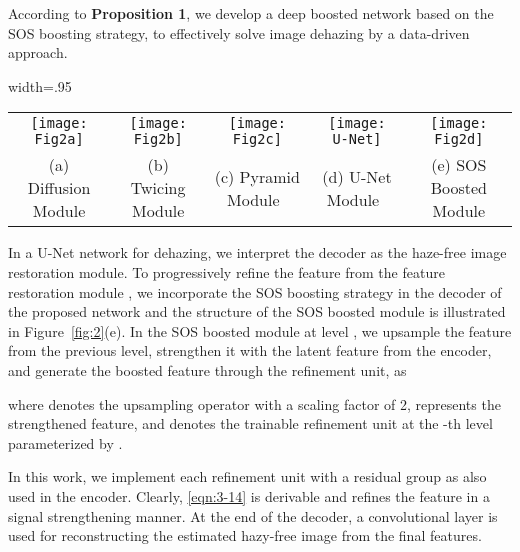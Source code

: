 \documentclass[10pt,twocolumn,letterpaper]{article}
\newcommand{\figref}[1]{Figure~\ref{fig:#1}}
\begin{document}
  According to {\bf Proposition 1}, we develop a deep boosted network based on the SOS boosting strategy, to effectively solve image dehazing by a data-driven approach.
  
\begin{figure*}[!htb]
    \centering
    \begin{adjustbox}{width=.95\linewidth}
    \begin{tabular}{ccccc}
      \texttt{[image: Fig2a]} & \hspace{3mm}
      \texttt{[image: Fig2b]} & \hspace{3mm}
      \texttt{[image: Fig2c]} & \hspace{5mm}
      \texttt{[image: U-Net]} & \hspace{5mm}
      \texttt{[image: Fig2d]} \\
      (a) Diffusion Module \cite{DiffusionBoosting} & (b) Twicing Module \cite{TwicingBoosting} & (c) Pyramid Module~\cite{FPN} & (d) U-Net Module~\cite{UNet} & (e) SOS Boosted Module
    \end{tabular}
  \end{adjustbox}
    \caption{
      \textbf{Architectures of different boosted modules.}
The green trapezoidal block denotes the deconvolutional layer with a stride of 2 in the decoder module.
    }
\label{fig:2}
    \vspace{-6mm}
    \end{figure*}


  In a U-Net network for dehazing, we interpret the decoder as the haze-free image restoration module.
To progressively refine the feature  from the feature restoration module ,
we incorporate the SOS boosting strategy in the decoder of the proposed network and the structure of the SOS boosted module is illustrated in \figref{2}(e).
In the SOS boosted module at level , we upsample the feature  from the previous level, strengthen it with the latent feature  from the encoder,
  and generate the boosted feature  through the refinement unit, as

where  denotes the upsampling operator with a scaling factor of 2,  represents the strengthened feature,
  and  denotes the trainable refinement unit at the -th level parameterized by .
  
  In this work, we implement each refinement unit with a residual group as also used in the encoder.
Clearly, \eqref{eqn:3-14} is derivable and refines the feature  in a signal strengthening manner.
At the end of the decoder, a convolutional layer is used for reconstructing the estimated hazy-free image  from the final features.
  
\end{document}
